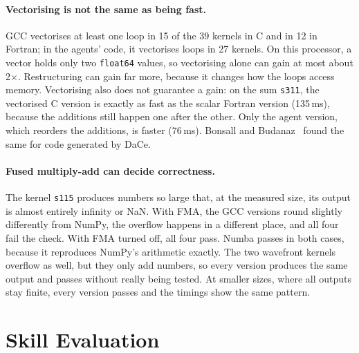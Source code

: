 \paragraph{Vectorising is not the same as being fast.}
GCC vectorises at least one loop in 15 of the 39 kernels in C and in 12 in Fortran; in the
agents' code, it vectorises loops in 27 kernels. On this processor, a vector holds only two
\texttt{float64} values, so vectorising alone can gain at most about 2$\times$. Restructuring can
gain far more, because it changes how the loops access memory. Vectorising also does not
guarantee a gain: on the sum \texttt{s311}, the vectorised C version is exactly as fast as the
scalar Fortran version (135\,ms), because the additions still happen one after the other. Only
the agent version, which reorders the additions, is faster (76\,ms). Bonsall and
Budanaz~\cite{bonsall2026dace} found the same for code generated by DaCe.

\paragraph{Fused multiply-add can decide correctness.}
\label{par:fma}
The kernel \texttt{s115} produces numbers so large that, at the measured size, its output is
almost entirely infinity or NaN. With FMA, the GCC versions round slightly differently from
NumPy, the overflow happens in a different place, and all four fail the check. With FMA turned
off, all four pass. Numba passes in both cases, because it reproduces NumPy's arithmetic
exactly. The two wavefront kernels overflow as well, but they only add numbers, so every version
produces the same output and passes without really being tested. At smaller sizes, where all
outputs stay finite, every version passes and the timings show the same pattern.


\section{Skill Evaluation}

